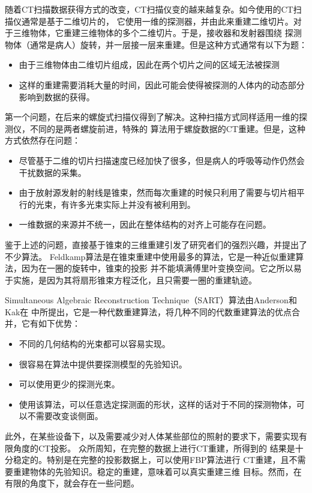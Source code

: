 随着CT扫描数据获得方式的改变，CT扫描仪变的越来越复杂。如今使用的CT扫描仪通常是基于二维切片的，
它使用一维的探测器，并由此来重建二维切片。对于三维物体，它重建三维物体的多个二维切片。于是，接收器和发射器围绕
探测物体（通常是病人）旋转，并一层接一层来重建。但是这种方式通常有以下为题：
\begin{itemize}
\item 由于三维物体由二维切片组成，因此在两个切片之间的区域无法被探测
\item 这样的重建需要消耗大量的时间，因此可能会使得被探测的人体内的动态部分影响到数据的获得。
\end{itemize}
第一个问题，在后来的螺旋式扫描仪得到了解决。这种扫描方式同样适用一维的探测仪，不同的是两者螺旋前进，特殊的
算法用于螺旋数据的CT重建。但是，这种方式依然存在问题：
\begin{itemize}
\item 尽管基于二维的切片扫描速度已经加快了很多，但是病人的呼吸等动作仍然会干扰数据的采集。
\item 由于放射源发射的射线是锥束，然而每次重建的时候只利用了需要与切片相平行的光束，有许多光束实际上并没有被利用到。
\item 一维数据的来源并不统一，因此在整体结构的对齐上可能存在问题。
\end{itemize}

鉴于上述的问题，直接基于锥束的三维重建引发了研究者们的强烈兴趣，并提出了不少算法。
Feldkamp算法\cite{badea2000volume}是在锥束重建中使用最多的算法，它是一种近似重建算法，因为在一圈的旋转中，锥束的投影
并不能填满傅里叶变换空间。它之所以易于实施，是因为其将扇形锥束方程泛化，且只需要一圈的重建轨迹。

Simultaneous Algebraic Reconstruction Technique（SART）算法由Anderson和Kak在\cite{andersen1984simultaneous}
中所提出，它是一种代数重建算法，将几种不同的代数重建算法的优点合并，它有如下优势：
\begin{itemize}
\item 不同的几何结构的光束都可以容易实现。
\item 很容易在算法中提供要探测模型的先验知识。
\item 可以使用更少的探测光束\cite{mueller1998fast}。
\item 使用该算法，可以任意选定探测面的形状，这样的话对于不同的探测物体，可以不需要改变谈侧面。
\end{itemize}

此外，在某些设备下，以及需要减少对人体某些部位的照射的要求下，需要实现有限角度的CT投影。
众所周知，在完整的数据上进行CT重建，所得到的
结果是十分稳定的。特别是在完整的投影数据上，可以使用FBP算法进行
CT重建，且不需要重建物体的先验知识。稳定的重建，意味着可以真实重建三维
目标。然而，在有限的角度下，就会存在一些问题。


